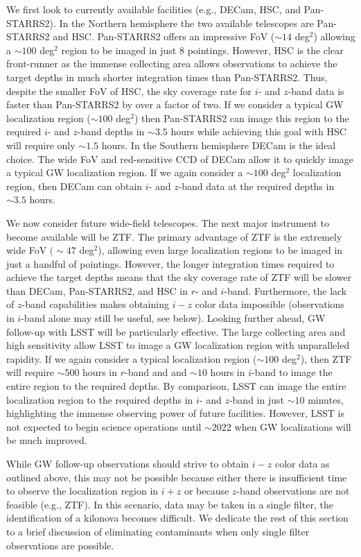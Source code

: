 We first look to currently available facilities (e.g., DECam, HSC, and Pan-STARRS2). In the Northern hemisphere the two available telescopes are Pan-STARRS2 and HSC. Pan-STARRS2 offers an impressive FoV ($\sim14$ deg$^2$) allowing a $\sim100$ deg$^2$ region to be imaged in just $8$ pointings. However, HSC is the clear front-runner as  the immense collecting area allows observations to achieve the target depths in much shorter integration times than Pan-STARRS2. Thus, despite the smaller FoV of HSC, the sky coverage rate for $i$- and $z$-band data is faster than Pan-STARRS2 by over a factor of two. If we consider a typical GW localization region ($\sim 100$ deg$^2$) then Pan-STARRS2 can image this region to the required $i$- and $z$-band depths in $\sim 3.5$ hours while achieving this goal with HSC will require only $\sim1.5$ hours. In the Southern hemisphere DECam is the ideal choice. The wide FoV and red-sensitive CCD of DECam allow it to quickly image a typical GW localization region. If we again consider a $\sim100$ deg$^2$  localization region, then DECam can obtain $i$- and $z$-band data at the required depths in $\sim3.5$ hours.

We now consider future wide-field telescopes. The next major instrument to become available will be ZTF. The primary advantage of ZTF is the extremely wide FoV $(\sim47$ deg$^2$), allowing even large localization regions to be imaged in just a handful of pointings. However, the longer integration times required to achieve the target depths means that the sky coverage rate of ZTF will be slower than DECam, Pan-STARRS2, and HSC in $r$- and $i$-band. Furthermore, the lack of $z$-band capabilities makes obtaining $i-z$ color data impossible (observations in $i$-band alone may still be useful, see below). Looking further ahead, GW follow-up with LSST will be particularly effective. The large collecting area and high sensitivity allow LSST to image a GW localization region with unparalleled rapidity. If we again consider a typical localization region ($\sim 100$ deg$^2$), then ZTF will require $\sim500$ hours in $r$-band and and $\sim10$ hours in $i$-band to image the entire region to the required depths. By comparison, LSST can image the entire localization region to the required depths in $i$- and $z$-band in just $\sim10$ minutes, highlighting the immense observing power of future facilities. However, LSST is not expected to begin science operations until $\sim2022$ when GW localizations will be much improved.

While GW follow-up observations should strive to obtain $i-z$ color data as outlined above, this may not be possible because either there is insufficient time to observe the localization region in $i+z$ or because $z$-band observations are not feasible (e.g., ZTF). In this scenario, data may be taken in a single filter,  the identification of a kilonova becomes difficult. We dedicate the rest of this section to a brief discussion of eliminating contaminants when only single filter observations are possible.

